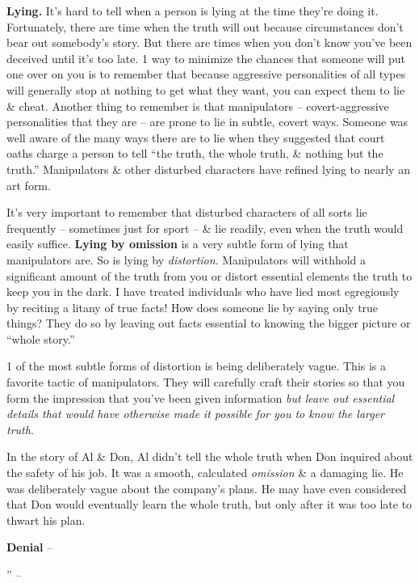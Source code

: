 \documentclass{article}
\numberwithin{equation}{section}
\begin{document}
\textbf{Lying.} It's hard to tell when a person is lying at the time they're doing it. Fortunately, there are time when the truth will out because circumstances don't bear out somebody's story. But there are times when you don't know you've been deceived until it's too late. 1 way to minimize the chances that someone will put one over on you is to remember that because aggressive personalities of all types will generally stop at nothing to get what they want, you can expect them to lie \& cheat. Another thing to remember is that manipulators -- covert-aggressive personalities that they are -- are prone to lie in subtle, covert ways. Someone was well aware of the many ways there are to lie when they suggested that court oaths charge a person to tell ``the truth, the whole truth, \& nothing but the truth.'' Manipulators \& other disturbed characters have refined lying to nearly an art form.

It's very important to remember that disturbed characters of all sorts lie frequently -- sometimes just for sport -- \& lie readily, even when the truth would easily suffice. \textbf{Lying by omission} is a very subtle form of lying that manipulators are. So is lying by \textit{distortion}. Manipulators will withhold a significant amount of the truth from you or distort essential elements the truth to keep you in the dark. I have treated individuals who have lied most egregiously by reciting a litany of true facts! How does someone lie by saying only true things? They do so by leaving out facts essential to knowing the bigger picture or ``whole story.''

1 of the most subtle forms of distortion is being deliberately vague. This is a favorite tactic of manipulators. They will carefully craft their stories so that you form the impression that you've been given information \textit{but leave out essential details that would have otherwise made it possible for you to know the larger truth}.

In the story of Al \& Don, Al didn't tell the whole truth when Don inquired about the safety of his job. It was a smooth, calculated \textit{omission} \& a damaging lie. He was deliberately vague about the company's plans. He may have even considered that Don would eventually learn the whole truth, but only after it was too late to thwart his plan.

\textbf{Denial} -- 

'' -- \cite[pp. 91--]{Simon2010}

\end{document}
